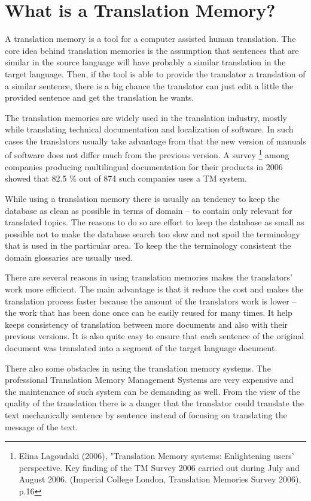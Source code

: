 \section{What is a Translation Memory?}

A translation memory is a tool for a computer assisted human translation.
 The core idea behind translation memories is the assumption that sentences that are similar in the source language will have probably a similar translation in the target language. Then, if the tool is able to provide the translator a translation of a similar sentence, there is a big chance the translator can just edit a little the provided sentence and get the translation he wants.

The translation memories are widely used in the translation industry, mostly while translating technical documentation and localization of software. In such cases the translators usually take advantage from that the new version of manuals of software does not differ much from the previous version. A survey \footnote{Elina Lagoudaki (2006), "Translation Memory systems: Enlightening users' perspective. Key finding of the TM Survey 2006 carried out during July and August 2006. (Imperial College London, Translation Memories Survey 2006), p.16} among companies producing multilingual documentation for their products in 2006 showed that 82.5 \% out of 874 such companies uses a TM system.

While using a translation memory there is usually an tendency to keep the database as clean as possible in terms of domain -- to contain only relevant for translated topics. The reasons to do so are effort to keep the database as small as possible not to make the database search too slow and not spoil the terminology that is used in the particular area. To keep the the terminology consistent the domain glossaries are usually used.

There are several reasons in using translation memories makes the translators' work more efficient. The main advantage is that it reduce the cost and makes the translation process faster because the amount of the translators work is lower -- the work that has been done once can be easily reused for many times. It help keeps consistency of translation between more documents and also with their previous versions. It is also quite easy to ensure that each sentence of the original document was translated into a segment of the target language document.

There also some obstacles in using the translation memory systems. The professional Translation Memory Management Systems are very expensive and the maintenance of such system can be demanding as well. From the view of the quality of the translation there is a danger that the translator could translate the text mechanically sentence by sentence instead of focusing on translating the message of the text.

